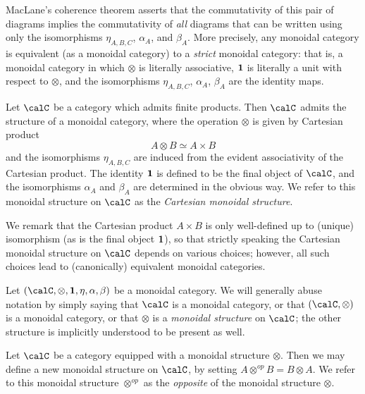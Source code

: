 MacLane's coherence theorem asserts that the commutativity of this pair of diagrams implies the commutativity of {\em all} diagrams that can be written using only the isomorphisms $\eta_{A,B,C}$, $\alpha_A$, and $\beta_A$. More precisely, any monoidal category is equivalent (as a monoidal category) to a {\em strict} monoidal category: that is, a monoidal category in which $\otimes$ is literally associative, ${\bf 1}$ is literally a unit with respect to $\otimes$, and the isomorphisms $\eta_{A,B,C}$, $\alpha_A$, $\beta_A$ are the identity maps.

\begin{example}
Let $\calC$ be a category which admits finite products. Then $\calC$ admits the structure of a monoidal category, where the operation $\otimes$ is given by Cartesian product
$$ A \otimes B \simeq A \times B$$
and the isomorphisms $\eta_{A,B,C}$ are induced from the evident associativity of the Cartesian product. The identity ${\bf 1}$ is defined to be the final object of $\calC$, and the isomorphisms
$\alpha_A$ and $\beta_A$ are determined in the obvious way. We refer to this monoidal structure on $\calC$ as the {\em Cartesian monoidal structure}.

We remark that the Cartesian product $A \times B$ is only well-defined up to (unique) isomorphism (as is the final object ${\bf 1}$), so that strictly speaking the Cartesian monoidal structure on $\calC$ depends on various choices; however, all such choices lead to (canonically) equivalent monoidal categories.
\end{example}

\begin{remark}
Let $(\calC, \otimes, {\bf 1}, \eta, \alpha, \beta)$ be a monoidal category. We will generally abuse notation by simply saying that $\calC$ is a monoidal category, or that $(\calC, \otimes)$ is a monoidal category, or that $\otimes$ is a {\it monoidal structure} on $\calC$; the other structure is implicitly understood to be present as well.
\end{remark}

\begin{remark}
Let $\calC$ be a category equipped with a monoidal structure $\otimes$. Then we may define a new monoidal structure on $\calC$, by setting $A \otimes^{op} B = B \otimes A$. We refer to this monoidal structure $\otimes^{op}$ as the {\it opposite} of the monoidal structure $\otimes$.
\end{remark}

